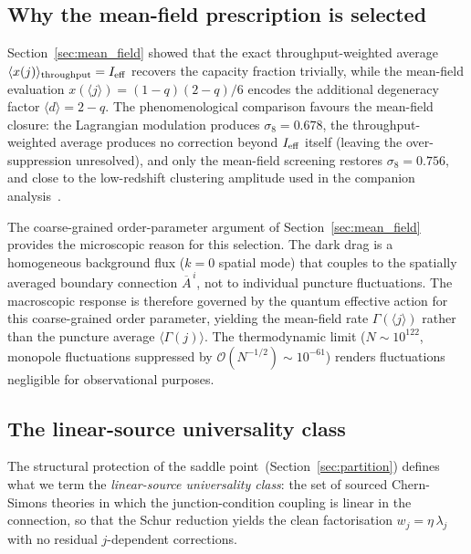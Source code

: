 \documentclass[aps,prd,twocolumn,10pt,superscriptaddress,nofootinbib]{revtex4-2}
\begin{document}
\subsection{Why the mean-field prescription is selected}
\label{sec:mean_field_discussion}

Section~\ref{sec:mean_field} showed that the exact
throughput-weighted average
$\langle x(j) \rangle_{\rm throughput} = I_{\rm eff}$ recovers
the capacity fraction trivially, while the mean-field evaluation
$x(\langle j \rangle) = (1-q)(2-q)/6$ encodes the additional
degeneracy factor $\langle d \rangle = 2-q$.  The phenomenological comparison favours the
mean-field closure: the Lagrangian modulation produces
$\sigma_8 = 0.678$, the throughput-weighted average produces no
correction beyond $I_{\rm eff}$ itself (leaving the
over-suppression unresolved), and only the mean-field screening
restores
$\sigma_8 = 0.756$, and close to the low-redshift clustering amplitude used in the
companion analysis~\cite{Sayegh2026}.

The coarse-grained order-parameter argument of
Section~\ref{sec:mean_field} provides the microscopic reason for
this selection.  The dark drag is a homogeneous background flux
($k = 0$ spatial mode) that couples to the spatially averaged
boundary connection $\overline{A}^{\,i}$, not to individual
puncture fluctuations.  The macroscopic response is therefore
governed by the quantum effective action for this coarse-grained
order parameter, yielding the mean-field rate
$\Gamma(\langle j \rangle)$ rather than the puncture average
$\langle \Gamma(j) \rangle$.  The thermodynamic limit
($N \sim 10^{122}$, monopole fluctuations suppressed by
$\mathcal{O}(N^{-1/2}) \sim 10^{-61}$) renders fluctuations
negligible for observational purposes.


\subsection{The linear-source universality class}
\label{sec:universality}

The structural protection of the saddle
point~(Section~\ref{sec:partition}) defines what we term the
\emph{linear-source universality class}: the set of sourced
Chern-Simons theories in which the junction-condition coupling is
linear in the connection, so that the Schur reduction yields the
clean factorisation $w_j = \eta\,\lambda_j$ with no residual
$j$-dependent corrections.
\end{document}
